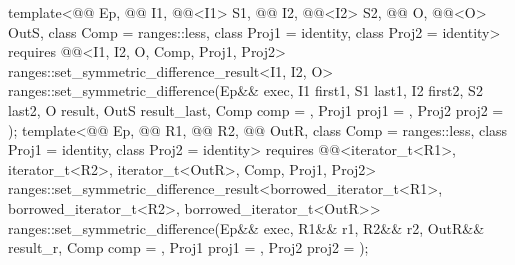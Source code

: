 \begin{itemdecl}
template<@@ Ep, @@ I1, @@<I1> S1,
         @@ I2, @@<I2> S2,
         @@ O, @@<O> OutS, class Comp = ranges::less,
         class Proj1 = identity, class Proj2 = identity>
  requires @@<I1, I2, O, Comp, Proj1, Proj2>
  ranges::set_symmetric_difference_result<I1, I2, O>
    ranges::set_symmetric_difference(Ep&& exec, I1 first1, S1 last1,
                                     I2 first2, S2 last2, O result, OutS result_last,
                                     Comp comp = {}, Proj1 proj1 = {}, Proj2 proj2 = {});
template<@@ Ep, @@ R1, @@ R2,
         @@ OutR, class Comp = ranges::less,
         class Proj1 = identity, class Proj2 = identity>
  requires @@<iterator_t<R1>, iterator_t<R2>, iterator_t<OutR>, Comp, Proj1, Proj2>
  ranges::set_symmetric_difference_result<borrowed_iterator_t<R1>, borrowed_iterator_t<R2>,
                                  borrowed_iterator_t<OutR>>
    ranges::set_symmetric_difference(Ep&& exec, R1&& r1, R2&& r2, OutR&& result_r,
                                     Comp comp = {}, Proj1 proj1 = {}, Proj2 proj2 = {});
\end{itemdecl}

